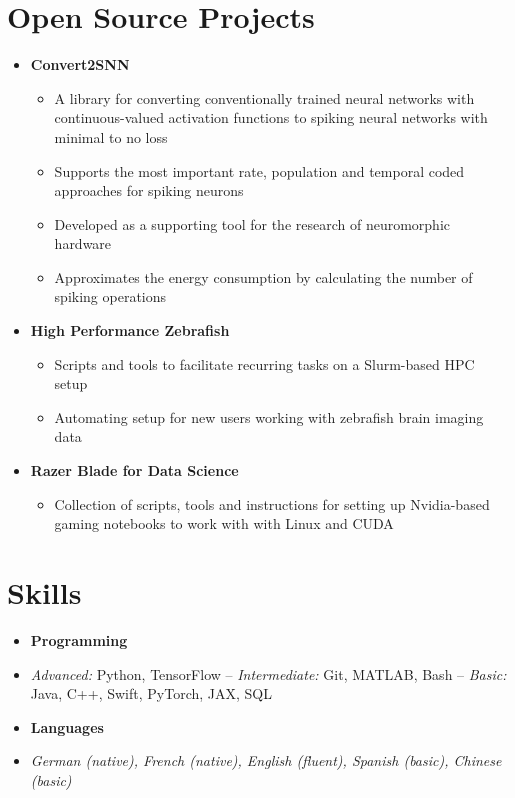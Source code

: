 \documentclass[a4paper,11pt]{article}
\newcommand{\entry}[1]{\item \small #1\vspace{-7pt}}
\newcommand{\entryBf}[2]{\item \textbf{#1}\hfill #2\vspace{-9pt}}
\newcommand{\entryIt}[1]{\item \textit{\small #1}\vspace{-7pt}}
\newcommand{\cvItemizeEnd}{\end{itemize} \vspace{-7pt}}
\newcommand{\cvItem}[1]{\item[--] \small #1\vspace{-2pt}}
\newcommand{\cvOS}[2]{\item \textbf{#1} \href{#2}{\faGithub} \vspace{-7pt}}
\begin{document}
\section{Open Source Projects}
\begin{itemize}

    \cvOS
        {Convert2SNN}{https://github.com/EtienneMueller/Convert2SNN}
    \begin{itemize}[rightmargin=16pt]
        \cvItem{A library for converting conventionally trained neural networks with continuous-valued activation functions to spiking neural networks with minimal to no loss}
        \cvItem{Supports the most important rate, population and temporal coded approaches for spiking neurons}
        \cvItem{Developed as a supporting tool for the research of neuromorphic hardware}
        \cvItem{Approximates the energy consumption by calculating the number of spiking operations}
    \cvItemizeEnd

    \cvOS
        {High Performance Zebrafish}{https://github.com/EtienneMueller/hpz}
    \begin{itemize}[rightmargin=16pt]
        \cvItem{Scripts and tools to facilitate recurring tasks on a Slurm-based HPC setup}
        \cvItem{Automating setup for new users working with zebrafish brain imaging data}
    \cvItemizeEnd

    \cvOS
        {Razer Blade for Data Science} {https://github.com/EtienneMueller/razer-blade-data-science}
    \begin{itemize}[rightmargin=16pt]
        \cvItem{Collection of scripts, tools and instructions for setting up Nvidia-based gaming notebooks to work with with Linux and CUDA}
    \cvItemizeEnd
\end{itemize}

\section{Skills}
\begin{itemize}
    \entryBf{Programming}{}
    \entry{\textit{Advanced:} Python, TensorFlow -- \textit{Intermediate:} Git, MATLAB, Bash -- \textit{Basic:} Java, C++, Swift, PyTorch, JAX, SQL}
    \entryBf{Languages}{}
    \entryIt{German (native), French (native), English (fluent), Spanish (basic), Chinese (basic)}
\end{itemize}
\end{document}

